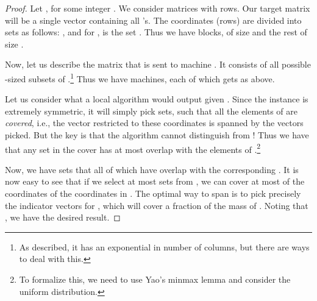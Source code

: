 \documentclass{article}
\begin{document}
\begin{proof}
Let , for some integer .  We consider matrices with  rows.  Our target matrix  will be a single vector containing all 's.  The coordinates (rows) are divided into sets as follows: , and for ,  is the set .  Thus we have  blocks,  of size  and the rest of size .

Now, let us describe the matrix  that is sent to machine .  It consists of all possible -sized subsets of .\footnote{As described, it has an exponential in  number of columns, but there are ways to deal with this.}  Thus we have  machines, each of which gets  as above.

Let us consider what a local algorithm would output given .  Since the instance is extremely symmetric, it will simply pick  sets, such that all the elements of  are {\em covered}, i.e., the vector  restricted to these coordinates is spanned by the vectors picked. But the key is that the algorithm cannot distinguish  from ! Thus we have that any set in the cover has at most  overlap with the elements of .\footnote{To formalize this, we need to use Yao's minmax lemma and consider the uniform distribution.}

Now, we have sets  that all of which have  overlap with the corresponding .  It is now easy to see that if we select at most  sets from , we can cover at most  of the coordinates of the  coordinates in . The optimal way to span  is to pick precisely the indicator vectors for , which will cover a  fraction of the mass of .  Noting that , we have the desired result.
\iffalse
We construct the set of columns  based on  and  as follows. 
We put  rows in  one for each number in .
We set the number of machines  to be equal to .
For any size  subset , we put an indicator column  in  with  ones in entries that belong to , and zeros elsewhere. 
Finally we set  to be just one column with all its entries equal to one. The symmetry we observe in each machine makes any algorithm unable to distinguish between entries in  and entries in . Therefore in expectation every selected column will have at most  non-zero entries in . Therefore we can say with high probability each column in  has at most  non-zero entries in  since  has size at most  (polynomial in ). So in the pool of selected columns  with high probability each column has at most  non-zero entries in . So any subset of   columns among the selected columns will not cover more than  entries of the  entries of . The proof completes by observing that  fraction of entries of  are in . 
\fi
\end{proof}
\end{document}
